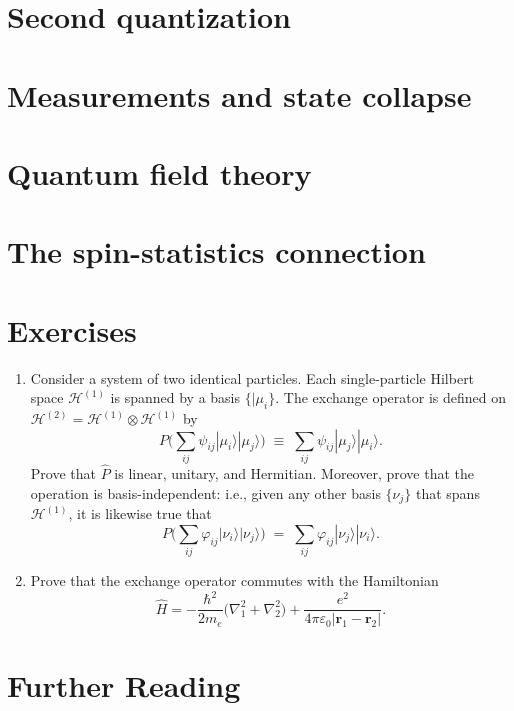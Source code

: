\documentclass[pra,11pt]{revtex4}
\begin{document}
\section{Second quantization}

\section{Measurements and state collapse}

\section{Quantum field theory}
\label{sec:qft}

\section{The spin-statistics connection}
\label{sec:spinstats}

\section*{Exercises}

\begin{enumerate}
\item Consider a system of two identical particles.  Each
  single-particle Hilbert space $\mathscr{H}^{(1)}$ is spanned by a
  basis $\{|\mu_i\}$.  The exchange operator is defined on
  $\mathscr{H}^{(2)} = \mathscr{H}^{(1)} \otimes \mathscr{H}^{(1)}$ by
$$P \Big (\sum_{ij} \psi_{ij} |\mu_i\rangle|\mu_j\rangle \Big)
  \;\equiv\;  \sum_{ij} \psi_{ij} |\mu_j\rangle|\mu_i\rangle.$$
  Prove that $\hat{P}$ is linear, unitary, and Hermitian.  Moreover,
  prove that the operation is basis-independent: i.e., given any other
  basis $\{\nu_j\}$ that spans $\mathscr{H}^{(1)}$, it is likewise
  true that
$$P \Big (\sum_{ij} \varphi_{ij} |\nu_i\rangle|\nu_j\rangle \Big)
  \;=\;  \sum_{ij} \varphi_{ij} |\nu_j\rangle|\nu_i\rangle.$$
  \label{ex:1}

\item
  Prove that the exchange operator commutes with the Hamiltonian
$$\hat{H} = - \frac{\hbar^2}{2m_e} \Big(\nabla_1^2 + \nabla^2_2\Big) + \frac{e^2}{4\pi\varepsilon_0|\mathbf{r}_1 - \mathbf{r}_2|}.$$ \label{ex:2}
  
\end{enumerate}

\section*{Further Reading}

\end{document}
